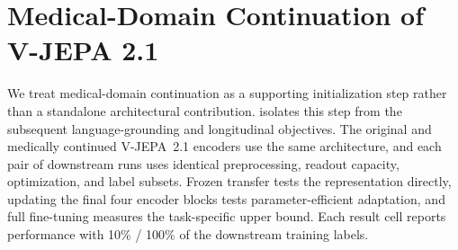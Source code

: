 \section{Medical-Domain Continuation of V-JEPA 2.1}
\label{app:medvjepa_transfer}

We treat medical-domain continuation as a supporting initialization step rather than a standalone architectural contribution.  isolates this step from the subsequent language-grounding and longitudinal objectives. The original and medically continued V-JEPA~2.1 encoders use the same architecture, and each pair of downstream runs uses identical preprocessing, readout capacity, optimization, and label subsets. Frozen transfer tests the representation directly, updating the final four encoder blocks tests parameter-efficient adaptation, and full fine-tuning measures the task-specific upper bound. Each result cell reports performance with 10\% / 100\% of the downstream training labels.

